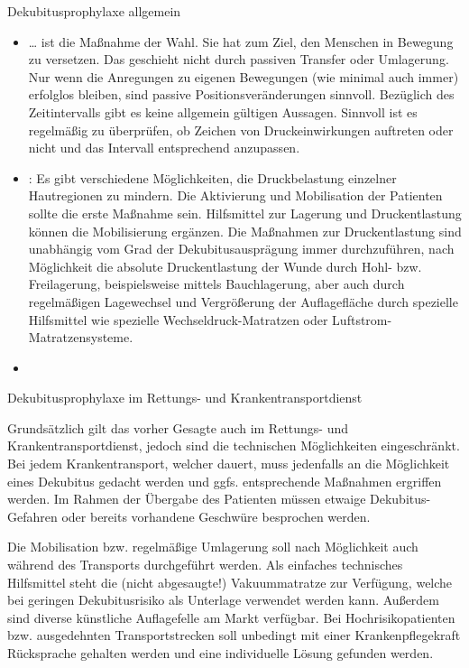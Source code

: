 \documentclass[
ngerman,
paper=a4,
asymmetric,
fontsize=10pt,
headings=small,
draft=false,
numbers=noenddot,
bibtotocnumbered,
footnotes=multiple,
toc=flat,
]{scrreprt}
\begin{document}
\begin{enumerate}
{\Text
{Dekubitusprophylaxe allgemein}
{
\begin{itemize}
  \item {} \ldots{} ist die Maßnahme der
  Wahl. Sie hat zum Ziel, den Menschen in Bewegung zu
  versetzen. Das geschieht nicht durch passiven Transfer oder Umlagerung.
  Nur wenn die Anregungen zu eigenen Bewegungen (wie minimal
  auch immer) erfolglos bleiben, sind passive
  Positionsveränderungen sinnvoll. Bezüglich des
  Zeitintervalls gibt es keine allgemein gültigen Aussagen.
  Sinnvoll ist es regelmäßig zu überprüfen, ob Zeichen von Druckeinwirkungen auftreten
  oder nicht und das Intervall entsprechend anzupassen.
  \item {}: Es gibt verschiedene
  Möglichkeiten, die Druckbelastung einzelner Hautregionen zu mindern. Die
  Aktivierung und Mobilisation der Patienten sollte die
  erste Maßnahme sein. Hilfsmittel zur Lagerung und
  Druckentlastung können die Mobilisierung ergänzen. Die
  Maßnahmen zur Druckentlastung sind unabhängig vom Grad der
  Dekubitusausprägung immer durchzuführen, nach Möglichkeit
  die absolute Druckentlastung der Wunde durch Hohl- bzw.
  Freilagerung, beispielsweise mittels Bauchlagerung, aber
  auch durch regelmäßigen Lagewechsel und Vergrößerung der
  Auflagefläche durch spezielle Hilfsmittel wie spezielle
  Wechseldruck-Matratzen oder Luftstrom-Matratzensysteme.
  \cite{Pflegewiki:Dekubitus}
  \item {}
\end{itemize}


}
{}
{}
{}
{}




\Text
{Dekubitusprophylaxe im Rettungs- und
Krankentransportdienst}
{
Grundsätzlich gilt das vorher Gesagte auch im Rettungs- und
Krankentransportdienst, jedoch sind die technischen
Möglichkeiten eingeschränkt. Bei jedem Krankentransport,
welcher  dauert, muss jedenfalls
an die Möglichkeit eines Dekubitus gedacht werden und ggfs.
entsprechende Maßnahmen ergriffen werden. Im Rahmen der
Übergabe des Patienten müssen etwaige Dekubitus-Gefahren
oder bereits vorhandene Geschwüre besprochen werden.

Die Mobilisation bzw. regelmäßige Umlagerung soll nach
Möglichkeit auch während des Transports durchgeführt
werden. Als einfaches technisches Hilfsmittel steht die
(nicht abgesaugte!) Vakuummatratze zur Verfügung, welche bei
geringen Dekubitusrisiko als Unterlage verwendet werden
kann. Außerdem sind diverse künstliche
Auflagefelle am Markt verfügbar. Bei Hochrisikopatienten
bzw. ausgedehnten Transportstrecken soll unbedingt mit einer
Krankenpflegekraft Rücksprache gehalten werden und eine
individuelle Lösung gefunden werden.

}}
\end{enumerate}
\end{document}
